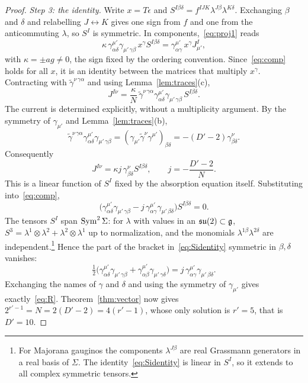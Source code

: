 \begin{proof}
\emph{Step 3: the identity.} Write $x=T\epsilon$ and $S^{I\beta\delta}=f^{IJK}\lambda^{J\beta}\lambda^{K\delta}$. Exchanging $\beta$ and $\delta$ and relabelling $J\leftrightarrow K$ gives one sign from $f$ and one from the anticommuting $\lambda$, so $S^I$ is symmetric. In components,~\eqref{eq:proj1} reads
\begin{equation}
\label{eq:comp}
\kappa\,\gamma^{\mu'}_{\alpha\delta}\gamma_{\mu'\,\gamma\beta}\,x^\gamma S^{I\beta\delta}=\gamma^{\mu'}_{\alpha\gamma}\,x^\gamma J^I_{\mu'} ,
\end{equation}
with $\kappa=\pm ag\ne0$, the sign fixed by the ordering convention. Since~\eqref{eq:comp} holds for all $x$, it is an identity between the matrices that multiply $x^\gamma$. Contracting with $\tilde\gamma^{\nu\,\gamma\alpha}$ and using Lemma~\ref{lem:traces}(c),
\begin{equation}
\label{eq:Jsolve}
J^{I\nu}=\frac{\kappa}{N}\,\tilde\gamma^{\nu\,\gamma\alpha}\gamma^{\mu'}_{\alpha\delta}\gamma_{\mu'\,\gamma\beta}\,S^{I\beta\delta}.
\end{equation}
The current is determined explicitly, without a multiplicity argument. By the symmetry of $\gamma_{\mu'}$ and Lemma~\ref{lem:traces}(b),
\[
 \tilde\gamma^{\nu\,\gamma\alpha}\gamma^{\mu'}_{\alpha\delta}
       \gamma_{\mu'\,\gamma\beta}
  =(\gamma_{\mu'}\tilde\gamma^\nu\gamma^{\mu'})_{\beta\delta}
  =-(D'-2)\gamma^\nu_{\beta\delta}.
\]
Consequently
\[
 J^{I\nu}=\kappa j\,\gamma^\nu_{\beta\delta}S^{I\beta\delta},
 \qquad j=-\frac{D'-2}{N}.
\]
This is a linear function of $S^I$ fixed by the absorption equation itself. Substituting into~\eqref{eq:comp},
\begin{equation}
\label{eq:Sidentity}
\bigl(\gamma^{\mu'}_{\alpha\delta}\gamma_{\mu'\,\gamma\beta}-j\,\gamma^{\mu'}_{\alpha\gamma}\gamma_{\mu'\,\beta\delta}\bigr)S^{I\beta\delta}=0 .
\end{equation}
The tensors $S^I$ span $\operatorname{Sym}^2\Sigma$: for $\lambda$ with values in an $\mathfrak{su}(2)\subset\mathfrak{g}$, $S^3=\lambda^{1}\otimes\lambda^{2}+\lambda^{2}\otimes\lambda^{1}$ up to normalization, and the monomials $\lambda^{1\beta}\lambda^{2\delta}$ are independent.\footnote{For Majorana gauginos the components $\lambda^{J\beta}$ are real Grassmann generators in a real basis of $\Sigma$. The identity~\eqref{eq:Sidentity} is linear in $S^I$, so it extends to all complex symmetric tensors.} Hence the part of the bracket in~\eqref{eq:Sidentity} symmetric in $\beta,\delta$ vanishes:
\[
\tfrac12\bigl(\gamma^{\mu'}_{\alpha\delta}\gamma_{\mu'\,\gamma\beta}+\gamma^{\mu'}_{\alpha\beta}\gamma_{\mu'\,\gamma\delta}\bigr)=j\,\gamma^{\mu'}_{\alpha\gamma}\gamma_{\mu'\,\beta\delta}.
\]
Exchanging the names of $\gamma$ and $\delta$ and using the symmetry of $\gamma_{\mu'}$ gives exactly~\eqref{eq:R}. Theorem~\ref{thm:vector} now gives $2^{r'-1}=N=2(D'-2)=4(r'-1)$, whose only solution is $r'=5$, that is $D'=10$.
\end{proof}

